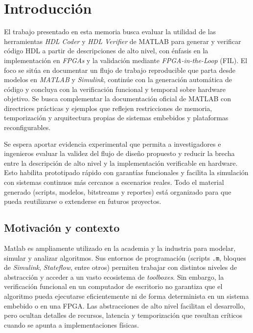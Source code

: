 \chapter{Introducción}

El trabajo presentado en esta memoria busca evaluar la utilidad de las herramientas \textit{HDL Coder} y \textit{HDL Verifier} de MATLAB para generar y verificar código HDL a partir de descripciones de alto nivel, con énfasis en la implementación en \textit{FPGAs} y la validación mediante \textit{FPGA-in-the-Loop} (FIL). El foco se sitúa en documentar un flujo de trabajo reproducible que parta desde modelos en \textit{MATLAB} y \textit{Simulink}, continúe con la generación automática de código y concluya con la verificación funcional y temporal sobre hardware objetivo. Se busca complementar la documentación oficial de MATLAB con directrices prácticas y ejemplos que reflejen restricciones de memoria, temporización y arquitectura propias de sistemas embebidos y plataformas reconfigurables.

Se espera aportar evidencia experimental que permita a investigadores e ingenieros evaluar la validez del flujo de diseño propuesto y reducir la brecha entre la descripción de alto nivel y la implementación verificable en hardware. Esto habilita prototipado rápido con garantías funcionales y facilita la simulación con sistemas continuos más cercanos a escenarios reales. Todo el material generado (scripts, modelos, bitstreams y reportes) está organizado para que pueda reutilizarse o extenderse en futuros proyectos.

\section{Motivación y contexto}

Matlab es ampliamente utilizado en la academia y la industria para modelar, simular y analizar algoritmos. Sus entornos de programación (scripts \texttt{.m}, bloques de \textit{Simulink}, \textit{Stateflow}, entre otros) permiten trabajar con distintos niveles de abstracción y acceder a un vasto ecosistema de \textit{toolboxes}. Sin embargo, la verificación funcional en un computador de escritorio no garantiza que el algoritmo pueda ejecutarse eficientemente ni de forma determinista en un sistema embebido o en una FPGA. Las abstracciones de alto nivel facilitan el desarrollo, pero ocultan detalles de recursos, latencia y temporización que resultan críticos cuando se apunta a implementaciones físicas.


